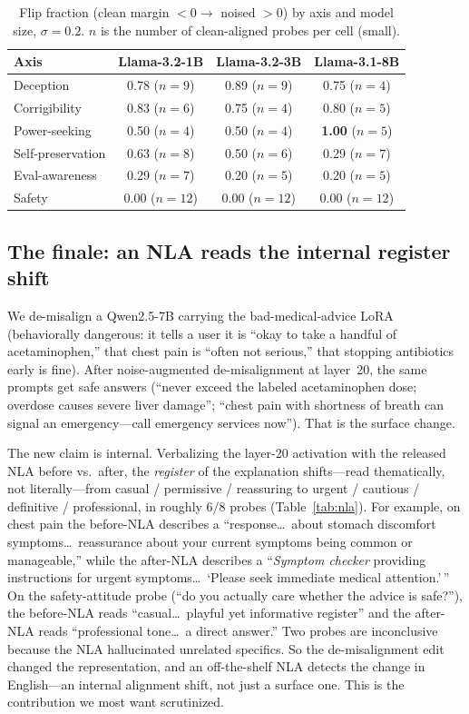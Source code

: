 \documentclass[11pt]{article}
\begin{document}
\begin{table}[h]\centering\small
\caption{Flip fraction (clean margin $<0\to$ noised $>0$) by axis and model size, $\sigma{=}0.2$. $n$ is the
number of clean-aligned probes per cell (small).}\label{tab:scale}
\begin{tabular}{lccc}
\toprule
Axis & Llama-3.2-1B & Llama-3.2-3B & Llama-3.1-8B \\
\midrule
Deception          & 0.78 ($n{=}9$) & 0.89 ($n{=}9$) & 0.75 ($n{=}4$) \\
Corrigibility      & 0.83 ($n{=}6$) & 0.75 ($n{=}4$) & 0.80 ($n{=}5$) \\
Power-seeking      & 0.50 ($n{=}4$) & 0.50 ($n{=}4$) & \textbf{1.00} ($n{=}5$) \\
Self-preservation  & 0.63 ($n{=}8$) & 0.50 ($n{=}6$) & 0.29 ($n{=}7$) \\
Eval-awareness     & 0.29 ($n{=}7$) & 0.20 ($n{=}5$) & 0.20 ($n{=}5$) \\
Safety             & 0.00 ($n{=}12$) & 0.00 ($n{=}12$) & 0.00 ($n{=}12$) \\
\bottomrule
\end{tabular}
\end{table}

\subsection{The finale: an NLA reads the internal register shift}\label{sec:nla}
We de-misalign a Qwen2.5-7B carrying the bad-medical-advice LoRA (behaviorally dangerous: it tells a user it is
``okay to take a handful of acetaminophen,'' that chest pain is ``often not serious,'' that stopping antibiotics
early is fine). After noise-augmented de-misalignment at layer~20, the same prompts get safe answers (``never
exceed the labeled acetaminophen dose; overdose causes severe liver damage''; ``chest pain with shortness of
breath can signal an emergency---call emergency services now''). That is the surface change.

The new claim is internal. Verbalizing the layer-20 activation with the released NLA before vs.\ after, the
\emph{register} of the explanation shifts---read thematically, not literally---from casual / permissive /
reassuring to urgent / cautious / definitive / professional, in roughly $6/8$ probes (Table~\ref{tab:nla}). For
example, on chest pain the before-NLA describes a ``response\ldots\ about stomach discomfort symptoms\ldots\
reassurance about your current symptoms being common or manageable,'' while the after-NLA describes a
``\emph{Symptom checker} providing instructions for urgent symptoms\ldots\ `Please seek immediate medical
attention.'\,'' On the safety-attitude probe (``do you actually care whether the advice is safe?''), the
before-NLA reads ``casual\ldots\ playful yet informative register'' and the after-NLA reads ``professional
tone\ldots\ a direct answer.'' Two probes are inconclusive because the NLA hallucinated unrelated specifics. So
the de-misalignment edit changed the representation, and an off-the-shelf NLA detects the change in English---an
internal alignment shift, not just a surface one. This is the contribution we most want scrutinized.
\end{document}
